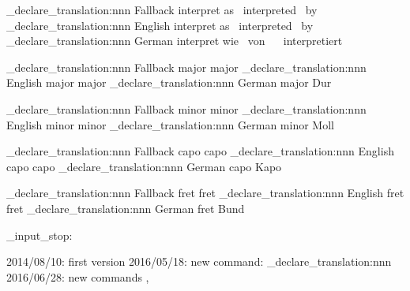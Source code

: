 \leadsheets_declare_translation:nnn {Fallback} {interpret}
  {as~ interpreted~ by~ }
\leadsheets_declare_translation:nnn {English}  {interpret}
  {as~ interpreted~ by~ }
\leadsheets_declare_translation:nnn {German}   {interpret}
  {wie~ von~ ~ interpretiert}

\leadsheets_declare_translation:nnn {Fallback} {major} {major}
\leadsheets_declare_translation:nnn {English}  {major} {major}
\leadsheets_declare_translation:nnn {German}   {major} {Dur}

\leadsheets_declare_translation:nnn {Fallback} {minor} {minor}
\leadsheets_declare_translation:nnn {English}  {minor} {minor}
\leadsheets_declare_translation:nnn {German}   {minor} {Moll}

\leadsheets_declare_translation:nnn {Fallback} {capo} {capo}
\leadsheets_declare_translation:nnn {English}  {capo} {capo}
\leadsheets_declare_translation:nnn {German}   {capo} {Kapo}

\leadsheets_declare_translation:nnn {Fallback} {fret} {fret}
\leadsheets_declare_translation:nnn {English}  {fret} {fret}
\leadsheets_declare_translation:nnn {German}   {fret} {Bund}

\file_input_stop:

2014/08/10: first version
2016/05/18: new command: \leadsheets_declare_translation:nnn
2016/06/28: new commands \leadsheetstranslate, 
